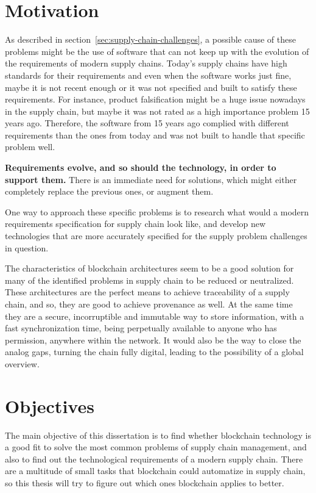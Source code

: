 
\section{Motivation} 
\label{sec:motivation}

As described in section~\ref{sec:supply-chain-challenges}, a possible cause of these problems might be the use of software that can not keep up with the evolution of the requirements of modern supply chains. Today's supply chains have high standards for their requirements and even when the software works just fine, maybe it is not recent enough or it was not specified and built to satisfy these requirements. For instance, product falsification might be a huge issue nowadays in the supply chain, but maybe it was not rated as a high importance problem 15 years ago. Therefore, the software from 15 years ago complied with different requirements than the ones from today and was not built to handle that specific problem well. 

\textbf{Requirements evolve, and so should the technology, in order to support them.} There is an immediate need for solutions, which might either completely replace the previous ones, or augment them.

One way to approach these specific problems is to research what would a modern requirements specification for supply chain look like, and develop new technologies that are more accurately specified for the supply problem challenges in question. 

The characteristics of blockchain architectures seem to be a good solution for many of the identified problems in supply chain to be reduced or neutralized. These architectures are the perfect means to achieve traceability of a supply chain, and so, they are good to achieve provenance as well. At the same time they are a secure, incorruptible and immutable way to store information, with a fast synchronization time, being perpetually available to anyone who has permission, anywhere within the network. It would also be the way to close the analog gaps, turning the chain fully digital, leading to the possibility of a global overview.

\section{Objectives}
\label{sec:objectives}
The main objective of this dissertation is to find whether blockchain technology is a good fit to solve the most common problems of supply chain management, and also to find out the technological requirements of a modern supply chain. There are a multitude of small tasks that blockchain could automatize in supply chain, so this thesis will try to figure out which ones blockchain applies to better. 


